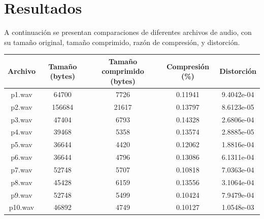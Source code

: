 \documentclass[a4paper,11pt]{article}
\begin{document}
\section{Resultados}
A continuación se presentan comparaciones de diferentes archivos de audio, con
su tamaño original, tamaño comprimido, razón de compresión, y distorción.
\begin{center}
    \begin{tabular}{| c | c | c | c | c |}
        \hline
        Archivo & Tamaño (bytes) & Tamaño comprimido (bytes) & Compresión (\%) &  Distorción \\ \hline
        p1.wav & 64700 & 7726 & 0.11941 & 9.4042e-04 \\
        p2.wav & 156684 & 21617 & 0.13797 & 8.6123e-05 \\
        p3.wav & 47404 & 6793 & 0.14328 & 2.6806e-04 \\
        p4.wav & 39468 & 5358 & 0.13574 & 2.8885e-05 \\
        p5.wav & 36644 & 4420 & 0.12062 & 1.8816e-04 \\
        p6.wav & 36644 & 4796 & 0.13086 & 6.1311e-04 \\
        p7.wav & 52748 & 5707 & 0.10818 & 7.0363e-04 \\
        p8.wav & 45428 & 6159 & 0.13556 & 3.1064e-04 \\
        p9.wav & 52748 & 5499 & 0.10424 & 7.9479e-04 \\
        p10.wav & 46892 & 4749 & 0.10127 & 1.0548e-03 \\
        \hline
    \end{tabular}
\end{center}
\end{document}
